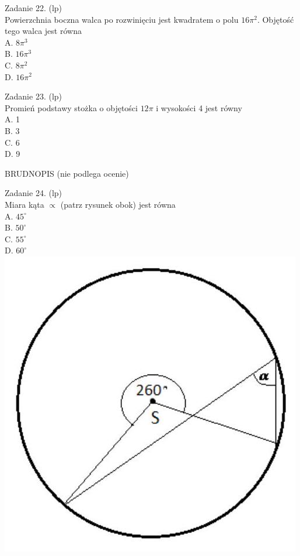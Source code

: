 \documentclass[10pt]{article}
\begin{document}
Zadanie 22. (lp)\\
Powierzchnia boczna walca po rozwinięciu jest kwadratem o polu \(16 \pi^{2}\). Objętość tego walca jest równa\\
A. \(8 \pi^{3}\)\\
B. \(16 \pi^{3}\)\\
C. \(8 \pi^{2}\)\\
D. \(16 \pi^{2}\)

Zadanie 23. (lp)\\
Promień podstawy stożka o objętości \(12 \pi\) i wysokości 4 jest równy\\
A. 1\\
B. 3\\
C. 6\\
D. 9

BRUDNOPIS (nie podlega ocenie)

Zadanie 24. (lp)\\
Miara kąta \(\propto\) (patrz rysunek obok) jest równa\\
A. \(45^{\circ}\)\\
B. \(50^{\circ}\)\\
C. \(55^{\circ}\)\\
D. \(60^{\circ}\)\\
\includegraphics[max width=\textwidth, center]{2024_11_21_90ea54b753259b37713ag-08}
\end{document}

